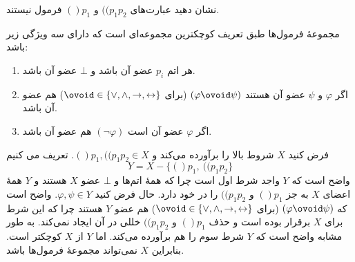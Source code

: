 نشان دهید عبارت‌های $((p_1p_2$ و $()p_1$ فرمول نیستند.
\begin{ans}
    مجموعهٔ فرمول‌ها طبق تعریف کوچکترین مجموعه‌ای است که دارای سه ویژگی زیر باشد:
    \begin{enumerate}[label=(\lr{\Roman*}),noitemsep]
        \item هر اتم
        $p_i$
        عضو آن باشد و
        $\bot$
        عضو آن باشد.
        \item اگر
        $\varphi$
        و
        $\psi$
        عضو آن هستند
        $(\varphi\ovoid \psi)$
        (برای
        $\ovoid\in\{\vee,\wedge,\to,\leftrightarrow\}$)
        هم عضو آن باشد.
        \item اگر
        $\varphi$
        عضو آن است
        $(\neg\varphi)$
        هم عضو آن باشد.
    \end{enumerate}
    فرض کنید
    $X$
    شروط بالا را برآورده می‌کند و
    $()p_1, ((p_1p_2 \in X$.
    تعریف می کنیم 
    $$Y = X - \{()p_1, \ ((p_1p_2\}$$
    واضح است که
    $Y$
    واجد شرط اول است چرا که همهٔ اتم‌ها و
    $\bot$
    عضو
    $X$
    هستند و
    $Y$
    همهٔ اعضای
    $X$
    به جز
    $()p_1$
    و
    $((p_1p_2$
    را در خود دارد.
    حال فرض کنید
    $\varphi,\psi\in Y$.
    واضح است که
    $(\varphi\ovoid \psi)$
    (برای
    $\ovoid\in\{\vee,\wedge,\to,\leftrightarrow\}$)
    هم عضو
    $Y$
    هستند چرا که این شرط برای
    $X$
    برقرار بوده است و حذف
    $()p_1$
    و
    $((p_1p_2$
    خللی در آن ایجاد نمی‌کند.
    به طور مشابه واضح است که
    $Y$
    شرط سوم را هم برآورده می‌کند. اما
    $Y$
    از
    $X$
    کوچکتر است. بنابراین
    $X$
    نمی‌تواند مجموعهٔ فرمول‌ها باشد. 
\end{ans}
